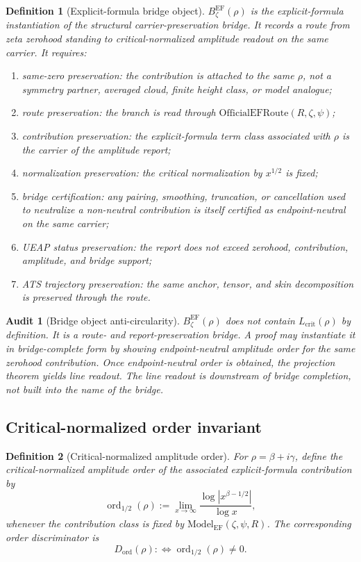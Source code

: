 \documentclass[11pt]{article}
\newtheorem{definition}{Definition}[section]
\newtheorem{audit}{Audit}[section]
\newcommand{\Lcrit}{L_{\mathrm{crit}}}
\newcommand{\ModelEF}{\mathrm{Model}_{\mathrm{EF}}}
\newcommand{\OfficialEFRoute}{\mathrm{OfficialEFRoute}}
\newcommand{\ordhalf}{\operatorname{ord}_{1/2}}
\newcommand{\Dord}{D_{\mathrm{ord}}}
\newcommand{\BzetaEF}{B^{\mathrm{EF}}_{\zeta}}
\begin{document}
\begin{definition}[Explicit-formula bridge object]
\(\BzetaEF(\rho)\) is the explicit-formula instantiation of the structural carrier-preservation bridge.  It records a route from zeta zerohood standing to critical-normalized amplitude readout on the same carrier.  It requires:
\begin{enumerate}[label=(B\arabic*)]
\item same-zero preservation: the contribution is attached to the same \(\rho\), not a symmetry partner, averaged cloud, finite height class, or model analogue;
\item route preservation: the branch is read through \(\OfficialEFRoute(R,\zeta,\psi)\);
\item contribution preservation: the explicit-formula term class associated with \(\rho\) is the carrier of the amplitude report;
\item normalization preservation: the critical normalization by \(x^{1/2}\) is fixed;
\item bridge certification: any pairing, smoothing, truncation, or cancellation used to neutralize a non-neutral contribution is itself certified as endpoint-neutral on the same carrier;
\item UEAP status preservation: the report does not exceed zerohood, contribution, amplitude, and bridge support;
\item ATS trajectory preservation: the same anchor, tensor, and skin decomposition is preserved through the route.
\end{enumerate}
\end{definition}

\begin{audit}[Bridge object anti-circularity]
\(\BzetaEF(\rho)\) does not contain \(\Lcrit(\rho)\) by definition.  It is a route- and report-preservation bridge.  A proof may instantiate it in bridge-complete form by showing endpoint-neutral amplitude order for the same zerohood contribution.  Once endpoint-neutral order is obtained, the projection theorem yields line readout.  The line readout is downstream of bridge completion, not built into the name of the bridge.
\end{audit}

\subsection{Critical-normalized order invariant}

\begin{definition}[Critical-normalized amplitude order]
For \(\rho=\beta+i\gamma\), define the critical-normalized amplitude order of the associated explicit-formula contribution by
\[
\ordhalf(\rho):=\lim_{x\to\infty}\frac{\log |x^{\beta-1/2}|}{\log x},
\]
whenever the contribution class is fixed by \(\ModelEF(\zeta,\psi,R)\).  The corresponding order discriminator is
\[
\Dord(\rho):\Longleftrightarrow \ordhalf(\rho)\ne 0.
\]
\end{definition}
\end{document}
